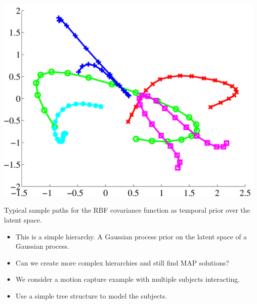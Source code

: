 \documentclass[english,color,smalltitle]{manchesterposter}
\begin{document}
\begin{multicols}{5}{\LARGE \par}
\begin{columnbox}
%
\begin{minipage}[c][1\totalheight]{1\columnwidth}%
\begin{center}
\includegraphics[width=0.8\columnwidth]{./diagrams/demTemporalSamplePaths}
\par\end{center}{\LARGE \par}

\begin{center}
\small Typical sample paths for the RBF covariance function as temporal
prior over the latent space.\label{fig:Typical-sample-paths}
\par\end{center}%
\end{minipage}{\large \par}

\end{columnbox}


\begin{columnbox}
\-


\begin{itemize}
\item This is a simple hierarchy. A Gaussian process prior on the latent
space of a Gaussian process.{\large \par}
\item Can we create more complex hierarchies and still find MAP solutions?{\large \par}
\item We consider a motion capture example with multiple subjects interacting. {\large \par}
\item Use a simple tree structure to model the subjects.{\large \par}
\end{itemize}
\end{columnbox}



\end{multicols}
\end{document}
